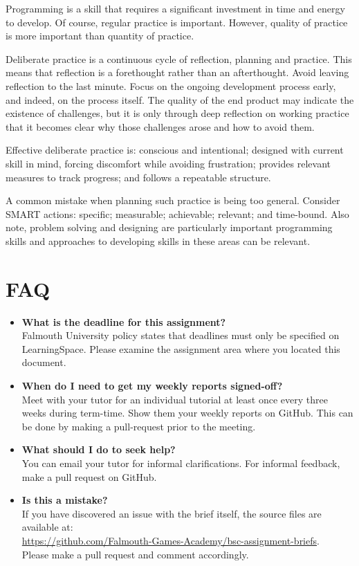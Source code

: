 \documentclass{../fal_assignment}
\begin{document}
Programming is a skill that requires a significant investment in time and energy to develop. Of course, regular practice is important. However, quality of practice is more important than quantity of practice.

Deliberate practice is a continuous cycle of reflection, planning and practice. This means that reflection is a forethought rather than an afterthought. Avoid leaving reflection to the last minute. Focus on the ongoing development process early, and indeed, on the process itself. The quality of the end product may indicate the existence of challenges, but it is only through deep reflection on working practice that it becomes clear why those challenges arose and how to avoid them.

Effective deliberate practice is: conscious and intentional; designed with current skill in mind, forcing discomfort while avoiding frustration; provides relevant measures to track progress; and follows a repeatable structure.

A common mistake when planning such practice is being too general. Consider SMART actions: specific; measurable; achievable; relevant; and time-bound. Also note, problem solving and designing are particularly important programming skills and approaches to developing skills in these areas can be relevant.

\section*{FAQ}

\begin{itemize}
	\item 	\textbf{What is the deadline for this assignment?} \\ 
    		Falmouth University policy states that deadlines must only be specified on LearningSpace. Please examine the assignment area where you located this document.
    			    		
	\item 	\textbf{When do I need to get my weekly reports signed-off?} \\ 
    		Meet with your tutor for an individual tutorial at least once every three weeks during term-time. Show them your weekly reports on GitHub. This can be done by making a pull-request prior to the meeting. 
    		
	\item 	\textbf{What should I do to seek help?} \\ 
    		You can email your tutor for informal clarifications. For informal feedback, make a pull request on GitHub. 
    		
    	\item 	\textbf{Is this a mistake?} \\ 	
    		If you have discovered an issue with the brief itself, the source files are available at: \\
    		\url{https://github.com/Falmouth-Games-Academy/bsc-assignment-briefs}.\\
    		 Please make a pull request and comment accordingly.
\end{itemize}
\end{document}
